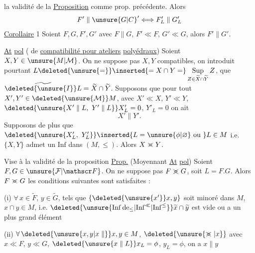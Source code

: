   la validité de la
\uline{Proposition}\quad {} comme  prop. précédente. Alors
\[
F'\parallel{\unsure{G|C}}'\Longleftrightarrow F'_L\parallel G'_L
\]
\uline{Corollaire} 1  Soient $F,G,F',G'$ avec $F\parallel G$, $F'\ll F$, $G'\ll G$, alors $F'\parallel G'$.

\uline{At} \uline{pol}  ( de \uline{compatibilité pour ateliers} \uline{polyédraux}) Soient $X,Y\in\unsure{M|\mathcal M}$. On ne suppose pas $X,Y$ compatibles, on introduit pourtant $L\deleted{\unsure{=}}\inserted{=X\cap Y=}\mathop{\mathrm{Sup}}\limits_{Z\in\widetilde X\cap\widetilde Y}Z$,   que $\widetilde{\deleted{\unsure{I}}L}=\widetilde X\cap\widetilde Y$. Supposons que pour tout $X',Y'\in\deleted{\unsure{\mathcal M}}M$, avec
$X'\ll X$, $Y'\ll Y$, $\deleted{\unsure{X'\parallel L,\ Y'\parallel L}}X'_L=0$, $Y'_L=0$ on ait
\[
X'\parallel Y'.
\]
 Supposons de plus que $\deleted{\unsure{X'_L,\ Y'_L}}\inserted{L=\unsure{\phi|\varnothing}\text{ ou }}L\in M$ i.e. $\{X,Y\}$  admet un $\mathrm{Inf}$ dans $(M,\leq)$. Alors $X\mathrel{>\mkern-12mu<}Y$.

Vise à la validité de la proposition
\uline{Prop.} (Moyennant \uline{At} \uline{pol}) Soient $F,G\in\unsure{\mathcal F|\mathscr F}$. On ne suppose pas $F\mathrel{>\mkern-12mu<}G$, soit $L=F.G$.  Alors $F\mathrel{>\mkern-12mu<}G$  les conditions suivantes sont satisfaites :

(i) $\forall\,x\in\widetilde F$, $y\in\widetilde G$,  tels que $\{\deleted{\unsure{x'}}x,y\}$ soit minoré dans $M$, $x\cap y\in M$, i.e. $\deleted{\unsure{\mathrm{Inf}\,\mathrm{de}_{\leq}|\mathrm{Inf}^{\ll}|\mathrm{Inf}^{\leq}}}\widetilde x\cap\widetilde y$ est vide ou a un plus grand élément

(ii) $\forall\,\deleted{\unsure{x,y|x\parallel}}x,y\in M$, $\deleted{\unsure{\mathrel{>\mkern-12mu<}|x}}$ avec $x\ll F$, $y\ll G$, $\deleted{\unsure{x\parallel L}}x_L=\phi$, $y_L=\phi$, on  a $x\parallel y$
